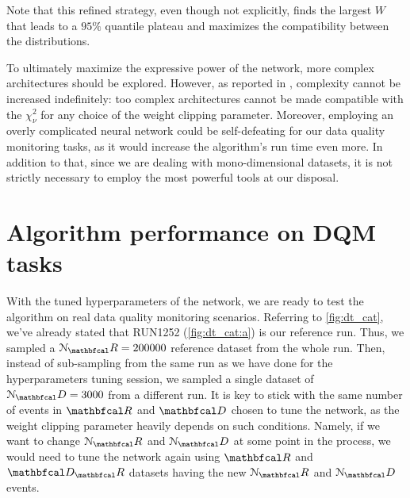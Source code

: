 Note that this refined strategy, even though not explicitly, finds the largest $W$ that leads to a $95\%$ quantile
plateau and maximizes the compatibility between the distributions.

To ultimately maximize the expressive power of the network, more complex architectures should be explored. However, as
reported in \cite{zanetti}, complexity cannot be increased indefinitely: too complex architectures cannot be made
compatible with the $\chi^2_{\nu}$ for any choice of the weight clipping parameter. Moreover, employing an overly
complicated neural network could be self-defeating for our data quality monitoring tasks, as it would increase the
algorithm's run time even more. In addition to that, since we are dealing with mono-dimensional datasets, it is not
strictly necessary to employ the most powerful tools at our disposal. 


\section{Algorithm performance on DQM tasks}

With the tuned hyperparameters of the network, we are ready to test the algorithm on real data quality monitoring
scenarios. Referring to \autoref{fig:dt_cat}, we've already stated that RUN1252 (\autoref{fig:dt_cat:a}) is our
reference run. Thus, we sampled a $\mathcal{N}_\R = 200000$ reference dataset from the whole run. Then, instead of
sub-sampling from the same run as we have done for the hyperparameters tuning session, we sampled a single dataset of
$\mathcal{N}_\D = 3000$ from a different run. It is key to stick with the same number of events in $\R$ and $\D$ chosen
to tune the network, as the weight clipping parameter heavily depends on such conditions. Namely, if we want to change
$\mathcal{N}_\R$ and $\mathcal{N}_\D$ at some point in the process, we would need to tune the network again using $\R$
and $\D_\R$ datasets having the new $\mathcal{N}_\R$ and $\mathcal{N}_\D$ events. \\ 


